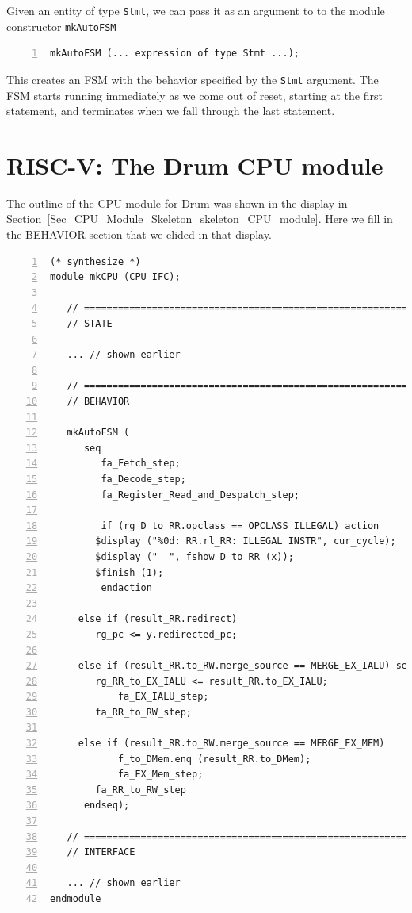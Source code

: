 Given an entity of type \verb|Stmt|, we can pass it as an argument to
to the module constructor \verb|mkAutoFSM|

\begin{Verbatim}[frame=single, numbers=left]
   mkAutoFSM (... expression of type Stmt ...);
\end{Verbatim}

This creates an FSM with the behavior specified by the \verb|Stmt|
argument.  The FSM starts running immediately as we come out of reset,
starting at the first statement, and terminates when we fall through
the last statement.


\section{RISC-V: The Drum CPU module}

\label{Sec_FSMs_Drum_CPU_module}


The outline of the CPU module for Drum was shown in the display in
Section~\ref{Sec_CPU_Module_Skeleton_skeleton_CPU_module}.  Here we
fill in the BEHAVIOR section that we elided in that display.

\begin{Verbatim}[frame=single, numbers=left]
(* synthesize *)
module mkCPU (CPU_IFC);

   // ================================================================
   // STATE

   ... // shown earlier

   // ================================================================
   // BEHAVIOR

   mkAutoFSM (
      seq
         fa_Fetch_step;
         fa_Decode_step;
         fa_Register_Read_and_Despatch_step;

         if (rg_D_to_RR.opclass == OPCLASS_ILLEGAL) action
	    $display ("%0d: RR.rl_RR: ILLEGAL INSTR", cur_cycle);
	    $display ("  ", fshow_D_to_RR (x));
	    $finish (1);
         endaction

	 else if (result_RR.redirect)
	    rg_pc <= y.redirected_pc;

	 else if (result_RR.to_RW.merge_source == MERGE_EX_IALU) seq
	    rg_RR_to_EX_IALU <= result_RR.to_EX_IALU;
            fa_EX_IALU_step;
	    fa_RR_to_RW_step;

	 else if (result_RR.to_RW.merge_source == MERGE_EX_MEM)
            f_to_DMem.enq (result_RR.to_DMem);
            fa_EX_Mem_step;
	    fa_RR_to_RW_step
      endseq);

   // ================================================================
   // INTERFACE

   ... // shown earlier
endmodule

\end{Verbatim}

